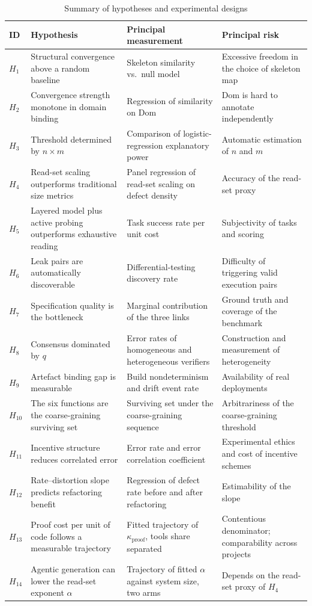 \begin{table}[htbp]
\centering
\footnotesize
\caption{Summary of hypotheses and experimental designs}\label{tab:hypotheses}
\begin{tabular}{L{0.9cm}L{4.0cm}L{4.6cm}L{4.6cm}}
\toprule
\textbf{ID} & \textbf{Hypothesis} & \textbf{Principal measurement} & \textbf{Principal risk} \\
\midrule
$H_1$ & Structural convergence above a random baseline & Skeleton similarity vs.\ null
  model & Excessive freedom in the choice of skeleton map \\
$H_2$ & Convergence strength monotone in domain binding &
  Regression of similarity on $\mathrm{Dom}$ &
  $\mathrm{Dom}$ is hard to annotate independently \\
$H_3$ & Threshold determined by $n\times m$ & Comparison of logistic-regression explanatory
  power & Automatic estimation of $n$ and $m$ \\
$H_4$ & Read-set scaling outperforms traditional size metrics &
  Panel regression of read-set scaling on defect density & Accuracy of the read-set proxy \\
$H_5$ & Layered model plus active probing outperforms exhaustive reading &
  Task success rate per unit cost & Subjectivity of tasks and scoring \\
$H_6$ & Leak pairs are automatically discoverable & Differential-testing discovery rate &
  Difficulty of triggering valid execution pairs \\
$H_7$ & Specification quality is the bottleneck & Marginal contribution of the three links &
  Ground truth and coverage of the benchmark \\
$H_8$ & Consensus dominated by $q$ & Error rates of homogeneous and heterogeneous verifiers &
  Construction and measurement of heterogeneity \\
$H_9$ & Artefact binding gap is measurable & Build nondeterminism and drift event rate &
  Availability of real deployments \\
$H_{10}$ & The six functions are the coarse-graining surviving set &
  Surviving set under the coarse-graining sequence &
  Arbitrariness of the coarse-graining threshold \\
$H_{11}$ & Incentive structure reduces correlated error &
  Error rate and error correlation coefficient &
  Experimental ethics and cost of incentive schemes \\
$H_{12}$ & Rate--distortion slope predicts refactoring benefit &
  Regression of defect rate before and after refactoring & Estimability of the slope \\
$H_{13}$ & Proof cost per unit of code follows a measurable trajectory &
  Fitted trajectory of $\kappa_{\text{proof}}$, tools share separated &
  Contentious denominator; comparability across projects \\
$H_{14}$ & Agentic generation can lower the read-set exponent $\alpha$ &
  Trajectory of fitted $\alpha$ against system size, two arms &
  Depends on the read-set proxy of $H_4$ \\
\bottomrule
\end{tabular}
\end{table}


